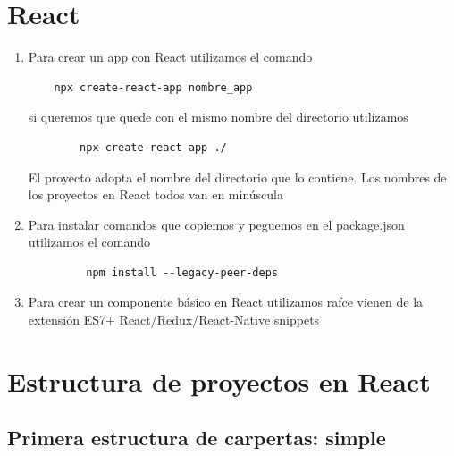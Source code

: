 \section{React}

\begin{enumerate}
	\item Para crear un app con React utilizamos el comando 
	\begin{verbatim}
	npx create-react-app nombre_app 
	\end{verbatim}
	si queremos que quede con el mismo nombre del directorio utilizamos 
	\begin{verbatim}
		npx create-react-app ./ 
	\end{verbatim}
    El proyecto adopta el nombre del directorio que lo contiene. Los nombres de los proyectos en React todos van en min\'uscula 
	\item Para instalar comandos que copiemos y peguemos en el package.json utilizamos el comando 
	\begin{verbatim}
		 npm install --legacy-peer-deps
	\end{verbatim}
    \item Para crear un componente b\'asico en React utilizamos rafce 
    vienen de la extensi\'on ES7+ React/Redux/React-Native snippets
\end{enumerate}




\section{Estructura de proyectos en React}

\subsection{Primera estructura de carpertas: simple}

